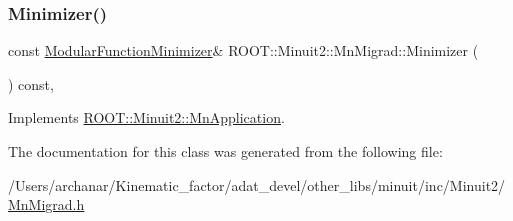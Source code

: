 \subsubsection{\texorpdfstring{Minimizer()}{Minimizer()}\hspace{0.1cm}{\footnotesize\ttfamily [2/2]}}
{\footnotesize\ttfamily const \mbox{\hyperlink{classROOT_1_1Minuit2_1_1ModularFunctionMinimizer}{Modular\+Function\+Minimizer}}\& R\+O\+O\+T\+::\+Minuit2\+::\+Mn\+Migrad\+::\+Minimizer (\begin{DoxyParamCaption}{ }\end{DoxyParamCaption}) const\hspace{0.3cm}{\ttfamily [inline]}, {\ttfamily [virtual]}}



Implements \mbox{\hyperlink{classROOT_1_1Minuit2_1_1MnApplication_a5a8e1e2658b731b5f4023dd1b1594223}{R\+O\+O\+T\+::\+Minuit2\+::\+Mn\+Application}}.



The documentation for this class was generated from the following file\+:\begin{DoxyCompactItemize}
\item 
/\+Users/archanar/\+Kinematic\+\_\+factor/adat\+\_\+devel/other\+\_\+libs/minuit/inc/\+Minuit2/\mbox{\hyperlink{other__libs_2minuit_2inc_2Minuit2_2MnMigrad_8h}{Mn\+Migrad.\+h}}\end{DoxyCompactItemize}

